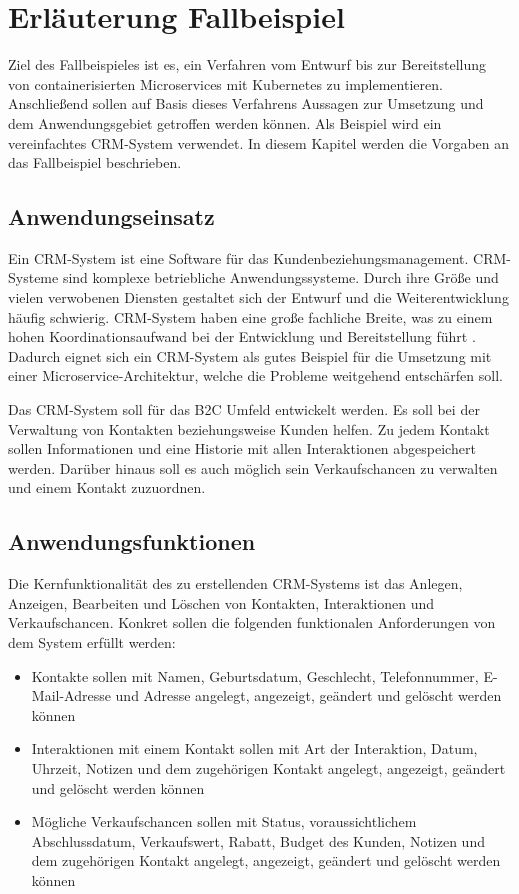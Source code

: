 \section{Erläuterung Fallbeispiel}
Ziel des Fallbeispieles ist es, ein Verfahren vom Entwurf bis zur Bereitstellung von containerisierten Microservices mit Kubernetes zu implementieren. Anschließend sollen auf Basis dieses Verfahrens Aussagen zur Umsetzung und dem Anwendungsgebiet getroffen werden können. Als Beispiel wird ein vereinfachtes \ac{CRM}-System verwendet. In diesem Kapitel werden die Vorgaben an das Fallbeispiel beschrieben.

\subsection{Anwendungseinsatz}
Ein \ac{CRM}-System ist eine Software für das Kundenbeziehungsmanagement. CRM-Systeme sind komplexe betriebliche Anwendungssysteme. Durch ihre Größe und vielen verwobenen Diensten gestaltet sich der Entwurf und die Weiterentwicklung häufig schwierig. \ac{CRM}-System haben eine große fachliche Breite, was zu einem hohen Koordinationsaufwand bei der Entwicklung und Bereitstellung führt \parencite[vgl.][S. 62]{trempArchitekturen2021}. Dadurch eignet sich ein \ac{CRM}-System als gutes Beispiel für die Umsetzung mit einer Microservice-Architektur, welche die Probleme weitgehend entschärfen soll. 

Das \ac{CRM}-System soll für das \ac{B2C} Umfeld entwickelt werden. Es soll bei der Verwaltung von Kontakten beziehungsweise Kunden helfen. Zu jedem Kontakt sollen Informationen und eine Historie mit allen Interaktionen abgespeichert werden. Darüber hinaus soll es auch möglich sein Verkaufschancen zu verwalten und einem Kontakt zuzuordnen.

\subsection{Anwendungsfunktionen}
Die Kernfunktionalität des zu erstellenden \ac{CRM}-Systems ist das Anlegen, Anzeigen, Bearbeiten und Löschen von Kontakten, Interaktionen und Verkaufschancen. Konkret sollen die folgenden funktionalen Anforderungen von dem System erfüllt werden:
\begin{itemize}
\item Kontakte sollen mit Namen, Geburtsdatum, Geschlecht, Telefonnummer, E-Mail-Adresse und Adresse angelegt, angezeigt, geändert und gelöscht werden können
\item Interaktionen mit einem Kontakt sollen mit Art der Interaktion, Datum, Uhrzeit, Notizen und dem zugehörigen Kontakt angelegt, angezeigt, geändert und gelöscht werden können
\item Mögliche Verkaufschancen sollen mit Status, voraussichtlichem Abschlussdatum, Verkaufswert, Rabatt, Budget des Kunden, Notizen und dem zugehörigen Kontakt angelegt, angezeigt, geändert und gelöscht werden können
\end{itemize} 


